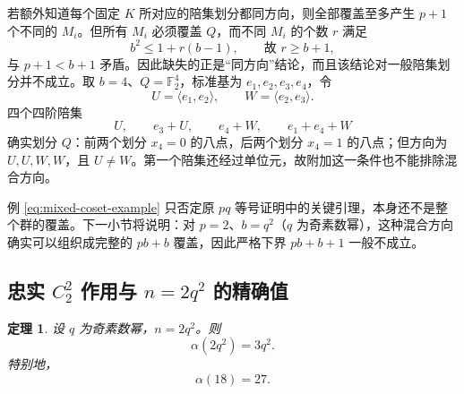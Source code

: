 \documentclass[11pt,a4paper]{article}
\numberwithin{equation}{section}
\theoremstyle{plain}
\newtheorem{theorem}{定理}[section]
\theoremstyle{definition}
\theoremstyle{remark}
\newcommand{\F}{\mathbb{F}}
\begin{document}
若额外知道每个固定 $K$ 所对应的陪集划分都同方向，则全部覆盖至多产生 $p+1$ 个不同的 $M_i$。但所有 $M_i$ 必须覆盖 $Q$，而不同 $M_i$ 的个数 $r$ 满足
\begin{equation}
 b^2\le1+r(b-1),\qquad\text{故 }r\ge b+1,
\end{equation}
与 $p+1<b+1$ 矛盾。因此缺失的正是“同方向”结论，而且该结论对一般陪集划分并不成立。取 $b=4$、$Q=\F_2^4$，标准基为 $e_1,e_2,e_3,e_4$，令
\begin{equation}
 U=\langle e_1,e_2\rangle,\qquad W=\langle e_2,e_3\rangle .
\end{equation}
四个四阶陪集
\begin{equation}\label{eq:mixed-coset-example}
 U,\qquad e_3+U,\qquad e_4+W,\qquad e_1+e_4+W
\end{equation}
确实划分 $Q$：前两个划分 $x_4=0$ 的八点，后两个划分 $x_4=1$ 的八点；但方向为 $U,U,W,W$，且 $U\ne W$。第一个陪集还经过单位元，故附加这一条件也不能排除混合方向。

例 \eqref{eq:mixed-coset-example} 只否定原 $pq$ 等号证明中的关键引理，本身还不是整个群的覆盖。下一小节将说明：对 $p=2$、$b=q^2$（$q$ 为奇素数幂），这种混合方向确实可以组织成完整的 $pb+b$ 覆盖，因此严格下界 $pb+b+1$ 一般不成立。

\subsection{忠实 \texorpdfstring{$C_2^2$}{C2^2} 作用与 \texorpdfstring{$n=2q^2$}{n=2q^2} 的精确值}\label{sec:2q2}

\begin{theorem}\label{thm:2q2}
设 $q$ 为奇素数幂，$n=2q^2$。则
\begin{equation}\label{eq:2q2-exact}
 \boxed{\alpha(2q^2)=3q^2.}
\end{equation}
特别地，
\begin{equation}\label{eq:n18-2q2-exact}
 \boxed{\alpha(18)=27.}
\end{equation}
\end{theorem}
\end{document}

